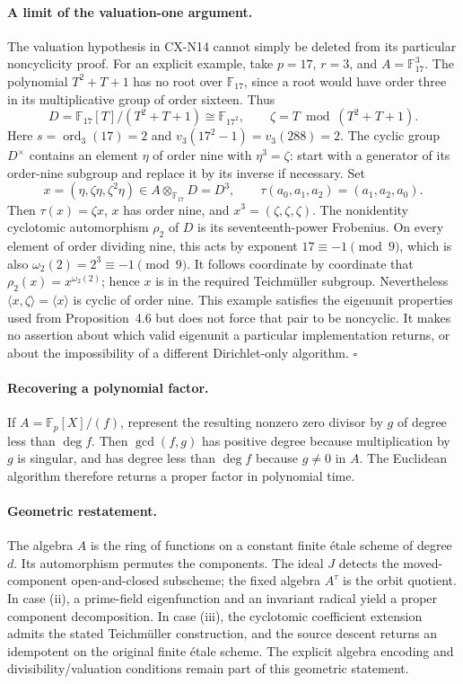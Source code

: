 \paragraph{A limit of the valuation-one argument.}
The valuation hypothesis in CX-N14 cannot simply be deleted from
its particular noncyclicity proof.
For an explicit example, take \(p=17\), \(r=3\), and
\(A=\mathbb F_{17}^3\).
The polynomial \(T^2+T+1\) has no root over \(\mathbb F_{17}\),
since a root would have order three in its multiplicative group
of order sixteen. Thus
\[
 D=\mathbb F_{17}[T]/(T^2+T+1)\cong\mathbb F_{17^2},
 \qquad \zeta=T\bmod(T^2+T+1).
\]
Here \(s=\operatorname{ord}_3(17)=2\) and
\(v_3(17^2-1)=v_3(288)=2\).
The cyclic group \(D^\times\) contains an element \(\eta\) of
order nine with \(\eta^3=\zeta\): start with a generator of its
order-nine subgroup and replace it by its inverse if necessary.
Set
\[
 x=(\eta,\zeta\eta,\zeta^2\eta)\in
 A\otimes_{\mathbb F_{17}}D=D^3,
 \qquad
 \tau(a_0,a_1,a_2)=(a_1,a_2,a_0).
\]
Then \(\tau(x)=\zeta x\), \(x\) has order nine, and
\(x^3=(\zeta,\zeta,\zeta)\).
The nonidentity cyclotomic automorphism \(\rho_2\) of \(D\)
is its seventeenth-power Frobenius.
On every element of order dividing nine, this acts by exponent
\(17\equiv-1\pmod9\), which is also
\(\omega_2(2)=2^3\equiv-1\pmod9\).
It follows coordinate by coordinate that
\(\rho_2(x)=x^{\omega_2(2)}\); hence \(x\) is in the required
Teichm\"uller subgroup.
Nevertheless \(\langle x,\zeta\rangle=\langle x\rangle\)
is cyclic of order nine.
This example satisfies the eigenunit properties used from
Proposition~4.6 but does not force that pair to be noncyclic.
It makes no assertion about which valid eigenunit a particular
implementation returns, or about the impossibility of a different
Dirichlet-only algorithm.
\hfill\(\square\)

\paragraph{Recovering a polynomial factor.}
If \(A=\mathbb F_p[X]/(f)\), represent the resulting nonzero zero
divisor by \(g\) of degree less than \(\deg f\).
Then \(\gcd(f,g)\) has positive degree because multiplication by
\(g\) is singular, and has degree less than \(\deg f\) because
\(g\ne0\) in \(A\). The Euclidean algorithm therefore returns
a proper factor in polynomial time.

\paragraph{Geometric restatement.}
The algebra \(A\) is the ring of functions on a constant finite
\'etale scheme of degree \(d\).
Its automorphism permutes the components.
The ideal \(J\) detects the moved-component open-and-closed
subscheme; the fixed algebra \(A^\tau\) is the orbit quotient.
In case (ii), a prime-field eigenfunction and an invariant radical
yield a proper component decomposition.
In case (iii), the cyclotomic coefficient extension admits the
stated Teichm\"uller construction, and the source descent returns
an idempotent on the original finite \'etale scheme.
The explicit algebra encoding and divisibility/valuation conditions
remain part of this geometric statement.
